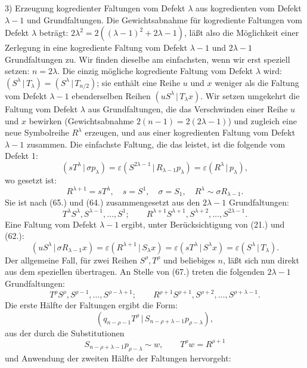 \documentclass[11pt]{article}
\providecommand{\pair}[2]{(#1\,|\,#2)}
\providecommand{\eps}{\varepsilon}
\begin{document}
3) Erzeugung kogredienter Faltungen vom Defekt $\lambda$ aus kogredienten vom Defekt $\lambda-1$ und Grundfaltungen. Die Gewichtsabnahme f\"ur kogrediente Faltungen vom Defekt $\lambda$ betr\"agt: $2\lambda^2=2((\lambda-1)^2+2\lambda-1)$, l\"a\ss t also die M\"oglichkeit einer Zerlegung in eine kogrediente Faltung vom Defekt $\lambda-1$ und $2\lambda-1$ Grundfaltungen zu. Wir finden dieselbe am einfachsten, wenn wir erst speziell setzen: $n=2\lambda$. Die einzig m\"ogliche kogrediente Faltung vom Defekt $\lambda$ wird: $\pair{S^\lambda}{T_\lambda}=\pair{S^\lambda}{T_{n/2}}$; sie enth\"alt eine Reihe $u$ und $x$ weniger als die Faltung vom Defekt $\lambda-1$ ebenderselben Reihen $\pair{uS^\lambda}{T_\lambda x}$. Wir setzen umgekehrt die Faltung vom Defekt $\lambda$ aus Grundfaltungen, die das Verschwinden einer Reihe $u$ und $x$ bewirken (Gewichtsabnahme $2(n-1)=2(2\lambda-1)$) und zugleich eine neue Symbolreihe $R^\lambda$ erzeugen, und aus einer kogredienten Faltung vom Defekt $\lambda-1$ zusammen. Die einfachste Faltung, die das leistet, ist die folgende vom Defekt 1:
\[
 \pair{sT^\lambda}{\sigma p_\lambda}=\eps\pair{S^{2\lambda-1}}{R_{\lambda-1}p_\lambda}=\eps\pair{R^\lambda}{p_\lambda},
\]
wo gesetzt ist:
\[
 R^{\lambda+1}=sT^\lambda,
 \quad s=S^1,
 \quad \sigma=S_1,
 \quad R^\lambda\sim\sigma R_{\lambda-1}.
\]
Sie ist nach (65.) und (64.) zusammengesetzt aus den $2\lambda-1$ Grundfaltungen:
\begin{equation}
 T^\lambda S^\lambda,S^{\lambda-1},\ldots,S^1;
 \qquad R^{\lambda+1}S^{\lambda+1},S^{\lambda+2},\ldots,S^{2\lambda-1}.
\tag{67}
\end{equation}
Eine Faltung vom Defekt $\lambda-1$ ergibt, unter Ber\"ucksichtigung von (21.) und (62.):
\[
 \pair{uS^\lambda}{\sigma R_{\lambda-1}x}=\eps\pair{R^{\lambda+1}}{S_\lambda x}
 =\eps\pair{sT^\lambda}{S^\lambda x}=\eps\pair{S^\lambda}{T_\lambda}.
\]
Der allgemeine Fall, f\"ur zwei Reihen $S^\rho,T^\rho$ und beliebiges $n$, l\"a\ss t sich nun direkt aus dem speziellen \"ubertragen. An Stelle von (67.) treten die folgenden $2\lambda-1$ Grundfaltungen:
\begin{equation}
 T^\rho S^\rho,S^{\rho-1},\ldots,S^{\rho-\lambda+1};
 \qquad R^{\rho+1}S^{\rho+1},S^{\rho+2},\ldots,S^{\rho+\lambda-1}.
\tag{68}
\end{equation}
Die erste H\"alfte der Faltungen ergibt die Form:
\[
 \pair{q_{n-\rho-1}T^\rho}{S_{n-\rho+\lambda-1}p_{\rho-\lambda}},
\]
aus der durch die Substitutionen
\[
 S_{n-\rho+\lambda-1}p_{\rho-\lambda}\sim w,
 \qquad T^\rho w=R^{\rho+1}
\]
und Anwendung der zweiten H\"alfte der Faltungen hervorgeht:
\end{document}
